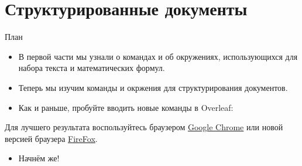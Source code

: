 \documentclass{beamer}
\subtitle{Часть 2: Структурированные документы и не только}
\begin{document}
\begin{frame}
\titlepage
\end{frame}

\section{Структурированные документы}

\begin{frame}{План}
\begin{multicols}{2}
\tableofcontents[currentsection]
\end{multicols}
\end{frame}

\begin{frame}{\insertsection}
\begin{itemize}
\item В первой части мы узнали о командах и об окружениях, использующихся
  для набора текста и математических формул.
\item Теперь мы изучим команды и окржения для структурирования документов.
\item Как и раньше, пробуйте вводить новые команды в Overleaf:
\end{itemize}
\vspace{2ex}
\begin{center}

\vspace{1ex}
\scriptsize
Для лучшего результата воспользуйтесь браузером
\href{http://www.google.com/chrome}{Google Chrome} или новой версией браузера
\href{http://www.mozilla.org/en-US/firefox/new/}{FireFox}.
\end{center}
\vspace{1ex}
\begin{itemize}
\item Начнём же!
\end{itemize}
\end{frame}
\end{document}
